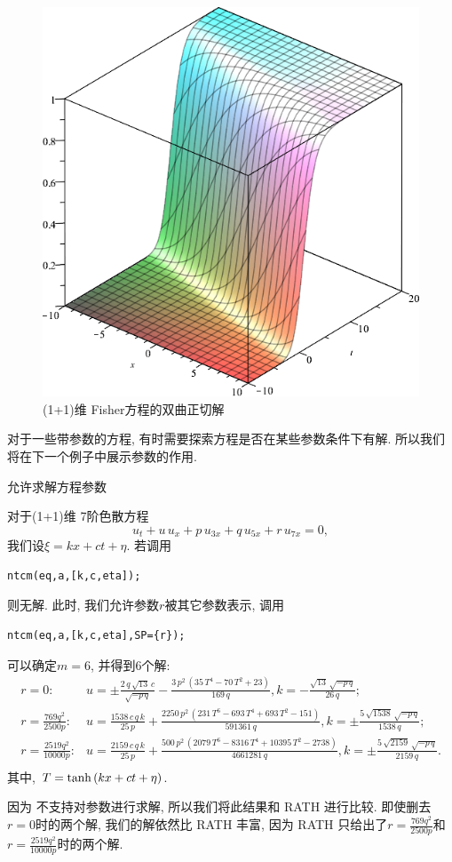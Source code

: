 \begin{example}
\begin{figure}[htbp]
\centering
\includegraphics[width=.45\textwidth]{fig/(1+1)Fisher-tanh.png}
\caption{(1+1)维 Fisher方程的双曲正切解\label{fisher-tanh}}
\end{figure}
    
\end{example}

对于一些带参数的方程, 有时需要探索方程是否在某些参数条件下有解. 所以我们将在下一个例子中展示参数的作用.

\begin{example}允许求解方程参数

对于(1+1)维 7阶色散方程\cite{duffy1996travelling}
\begin{equation}
    {{u}_{t}}+u\,{{u}_{x}}+p\,{{u}_{3x}}+q\,{{u}_{5x}}+r\,{{u}_{7x}}=0,
\end{equation}
我们设$\xi=kx+ct+\eta$. 若调用
\begin{verbatim}
ntcm(eq,a,[k,c,eta]);
\end{verbatim}
则无解. 此时, 我们允许参数$r$被其它参数表示, 调用
\begin{verbatim}
ntcm(eq,a,[k,c,eta],SP={r});
\end{verbatim}
可以确定$m=6$, 并得到6个解:
\begin{equation}
\renewcommand{\arraystretch}{1.2}
\begin{array}{rl}
r=0:& u=\pm \frac{2\,q\,\sqrt {13}\,c}{\sqrt {-p\,q}}-\frac{3\,{p}^{2}\,\left( 35\,{T}^{4}-70\,{T}^{2}+23\right) }{169\,q},k=-\frac{\sqrt {13}\,\sqrt {-p\,q}}{26\,q};\\
r=\frac{769 q^2}{2500 p}:& u=\frac{1538\,c\,q\,k}{25\,p}+\frac{2250\,{p}^{2}\,\left( 231\,{T}^{6}-693\,{T}^{4}+693\,{T}^{2}-151\right) }{591361\,q},k=\pm \frac{5\,\sqrt {1538}\,\sqrt {-p\,q}}{1538\,q};\\
r=\frac{2519 q^2}{10000 p}:& u=\frac{2159\,c\,q\,k}{25\,p}+\frac{500\,{p}^{2}\,\left( 2079\,{T}^{6}-8316\,{T}^{4}+10395\,{T}^{2}-2738\right) }{4661281\,q},k=\pm\frac{5\,\sqrt {2159}\,\sqrt {-p\,q}}{2159\,q}.\\
\end{array}
\end{equation}
其中, $T=\tanh\left(kx+ct+\eta\right)$. 

因为 不支持对参数进行求解, 所以我们将此结果和 RATH 进行比较. 即使删去$r=0$时的两个解, 我们的解依然比 RATH\cite[p21]{liu2001master} 丰富, 因为 RATH 只给出了$r=\frac{769 q^2}{2500 p}$和$r=\frac{2519 q^2}{10000 p}$时的两个解.
\end{example}

